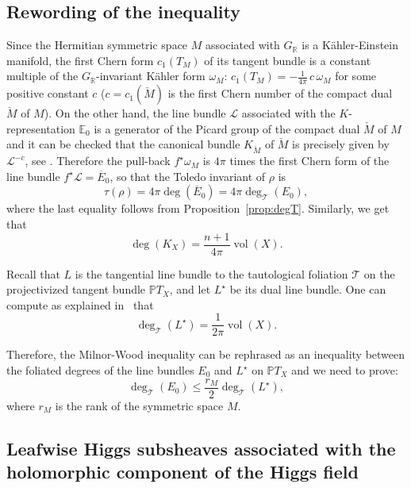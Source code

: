 \documentclass[JEP,XML,SOM,Unicode,NoFloatCountersInSection]{cedram}
\let\mathcal\mathscr
\newcommand{\citestar}[3]{\cite[#3]{#1}}
\theoremstyle{plain}
\theoremstyle{definition}
\let\cst c
\let\ov\overline
\DeclareMathOperator{\vol}{vol}
\newcommand{\cL}{\mathcal{L}}
\newcommand{\cT}{\mathcal{T}}
\newcommand{\bE}{\mathbb{E}}
\newcommand{\bR}{\mathbb{R}}
\newcommand{\PTX}{{\mathbb{P}T_X}}
\newcommand{\rkm}{{r_M}}
\newcommand{\ovE}{\ov{E}}
\begin{document}
\subsection{Rewording of the inequality}\label{subsec:reword}

Since the Hermitian symmetric space $M$ asso\-ciated with
$G_\bR$ is a Kähler-Einstein manifold, the first Chern
form $c_1(T_M)$ of its tangent bundle is a constant multiple of the $G_\bR$-invariant Kähler form $\omega_M$:
$c_1(T_M)=- \frac 1{4\pi}\,\cst \,\omega_M$ for some positive constant $\cst$ ($\cst=c_1(\check{M})$ is the first
Chern number of the compact dual $\check{M}$ of $M$). On the other hand, the line bundle $\cL$
associated with the $K$-representation $\bE_0$ is
a generator of the Picard group of the compact dual $\check{M}$ of $M$ and it can be checked that the
canonical bundle
$K_{\check{M}}$ of $\check{M}$ is precisely given by ${\cL}^{-\cst}$, see
\eg \citestar{KMgeneraltype}*{}.
Therefore the pull-back
$f^\star\omega_M$ is $4\pi$ times the first Chern form of the line bundle $f^\star\cL=\ovE_0$, so
that the Toledo invariant of $\rho$ is
\begin{equation}
\label{equa:toledo}
\tau(\rho)=4\pi\deg (\ovE_0)=4\pi\deg_\cT(E_0),
\end{equation}
where the last equality
follows from Proposition~\ref{prop:degT}. Similarly, we get that
\begin{equation}
\label{equa:deg-canonique}
\deg(K_X)=\frac{n+1}{4\pi}\vol (X).
\end{equation}

Recall that $L$ is the tangential line bundle to the tautological foliation $\cT$ on
the projectivized tangent bundle $\PTX$, and let $L^\star$ be its dual line bundle. One can compute
as explained in~\citestar{KM}*{.1} that
\begin{equation}
\label{equa:deg-L}
\deg_\cT(L^\star) = \frac{1}{2\pi} \vol(X).
\end{equation}

Therefore, the Milnor-Wood inequality can be rephrased as an inequality between the foliated degrees
of the line bundles $E_0$ and $L^\star$ on $\PTX$ and we need to prove:
\begin{equation}
\label{equa:rewording}
\deg_\cT(E_0) \leq \frac \rkm{2} \deg_\cT(L^\star),
\end{equation}
where $\rkm$ is the rank of the symmetric space $M$.

\subsection{Leafwise Higgs subsheaves associated with the holomorphic component of the Higgs field}
\label{subsec:HiggsSubsheaf}
\end{document}
